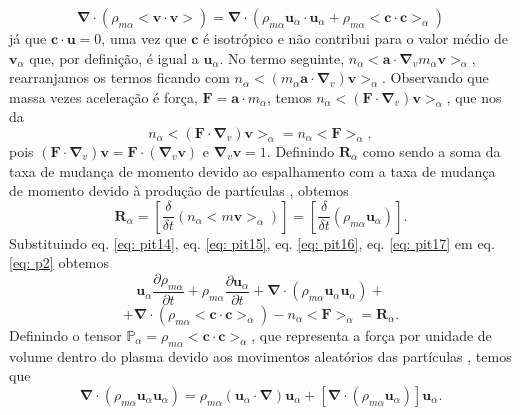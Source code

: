 \documentclass[12pt,oneside,a4paper]{abntex2}
\begin{document}
\begin{equation}
\label{eq: pit15}
\bm{\nabla} \cdot (\rho_{m\alpha} <\bm{v} \cdot \bm{v}>) = \bm{\nabla} \cdot ( \rho_{m\alpha}\bm{u}_\alpha \cdot \bm{u}_\alpha + \rho_{m\alpha}<\bm{c} \cdot \bm{c}>_\alpha)
\end{equation} 
já que $\bm{c} \cdot \bm{u} = 0$, uma vez que $\bm{c}$ é isotrópico e não contribui para o valor médio de $\bm{v}_\alpha$ que, por definição, é igual a $\bm{u}_\alpha$.  %
No termo seguinte, $n_\alpha<\bm{a} \cdot \bm{\nabla}_v m_\alpha \bm{v}>_\alpha$, rearranjamos os termos ficando com $n_\alpha<(m_\alpha \bm{a} \cdot \bm{\nabla}_v) \bm{v}>_\alpha$. Observando que massa vezes aceleração é força, $\bm{F} = \bm{a} \cdot m_\alpha $, temos $n_\alpha <(\bm{F} \cdot \bm{\nabla}_v)\bm{v}>_\alpha$, que nos da
\begin{equation}
\label{eq: pit16}
n_\alpha <(\bm{F} \cdot \bm{\nabla}_v)\bm{v}>_\alpha=n_\alpha<\bm{F}>_\alpha,
\end{equation}
pois $(\bm{F} \cdot \bm{\nabla}_v)\bm{v} = \bm{F} \cdot (\bm{\nabla}_v\bm{v})$ e $\bm{\nabla}_v\bm{v} = 1$. 
Definindo $\bm{R}_\alpha$ como sendo a soma da taxa de mudança de momento devido ao espalhamento com a taxa de mudança de momento devido à produção de partículas \cite[pg. 201]{bittencourt}, obtemos
\begin{equation}
\label{eq: pit17}
\bm{R}_\alpha = \left[\frac{\delta}{\delta t}(n_\alpha<m \bm{v}>_\alpha)\right]=\left[\frac{\delta}{\delta t}(\rho_{m\alpha}\bm{u}_\alpha)\right].
\end{equation}
Substituindo eq. \ref{eq: pit14}, eq. \ref{eq: pit15}, eq. \ref{eq: pit16}, eq. \ref{eq: pit17} em eq. \ref{eq: p2} obtemos
\begin{equation}
\label{eq: pit19}
\bm{u}_\alpha \frac{\partial \rho_{m\alpha}}{\partial t} + \rho_{m\alpha} \frac{\partial \bm{u}_\alpha}{\partial t}+ \bm{\nabla} \cdot (\rho_{m\alpha} \bm{u}_\alpha \bm{u}_\alpha)+
\end{equation} 
\begin{equation*}
+\bm{\nabla} \cdot (\rho_{m\alpha} <\bm{c} \cdot \bm{c}>_\alpha)-n_\alpha<\bm{F}>_\alpha=\bm{R}_\alpha.
\end{equation*}
Definindo o tensor $\mathbb{P}_\alpha=\rho_{m\alpha} <\bm{c} \cdot \bm{c}>_\alpha$, que representa a força por unidade de volume dentro do plasma devido aos movimentos aleatórios das partículas \cite[pg. 149]{bittencourt}, temos que
\begin{equation}
\label{eq: pit20}
\bm{\nabla} \cdot (\rho_{m\alpha} \bm{u}_\alpha \bm{u}_\alpha) =  \rho_{m\alpha}(\bm{u}_\alpha \cdot \bm{\nabla})\bm{u}_\alpha + [\bm{\nabla} \cdot (\rho_{m\alpha} \bm{u}_\alpha)]\bm{u}_\alpha.
\end{equation}
\end{document}
